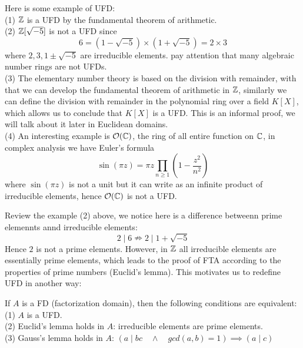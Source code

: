 \begin{remark}
    Here is some example of UFD:\\

    (1) \(\mathbb{Z}\) is a UFD by the fundamental theorem of arithmetic.\\ 

    (2) \(\mathbb{Z}[\sqrt{-5}]\) is not a UFD since
    \[6 = (1-\sqrt{-5})\times(1+\sqrt{-5}) = 2 \times 3\]
    where \(2,3,1\pm\sqrt{-5}\) are irreducible elements. pay attention that many algebraic number rings are not UFDs.\\

    (3) The elementary number theory is based on the division with remainder, with that we can develop the fundamental theorem of arithmetic in \(\mathbb{Z}\), similarly we can define the division with remainder in the polynomial ring over a field \(K[X]\), which allows us to conclude that \(K[X]\) is a UFD. This is an informal proof, we will talk about it later in Euclidean domains.\\

    (4) An interesting example is \(\mathcal{O}(\mathbb{C})\), the ring of all entire function on \(\mathbb{C}\), in complex analysis we have Euler's formula
    \[\sin(\pi z) = \pi z \prod_{n \geq 1}(1-\frac{z^2}{n^2})\]
    where \(\sin (\pi z)\) is not a unit but it can write as an infinite product of irreducible elements, hence \(\mathcal{O}(\mathbb{C})\) is not a UFD. 
\end{remark}

Review the example (2) above, we notice here is a difference betweenn prime elemennts annd irreducible elements:
\[2 \mid 6 \nRightarrow 2 \mid 1+\sqrt{-5}\]
Hence \(2\) is not a prime elements. However, in \(\mathbb{Z}\) all irreducible elements are essentially prime elements, which leads to the proof of FTA according to the properties of prime numbers (Euclid's lemma). This motivates us to redefine UFD in another way:

\begin{proposition}
    If \(A\) is a FD (factorization domain), then the following conditions are equivalent:\\
    (1) \(A\) is a UFD.\\
    (2) Euclid's lemma holds in \(A\): irreducible elements are prime elements. \\
    (3) Gauss's lemma holds in \(A\): \((a \mid bc \quad \land \quad gcd(a,b) =1 ) \implies (a \mid c)\)
\end{proposition}

